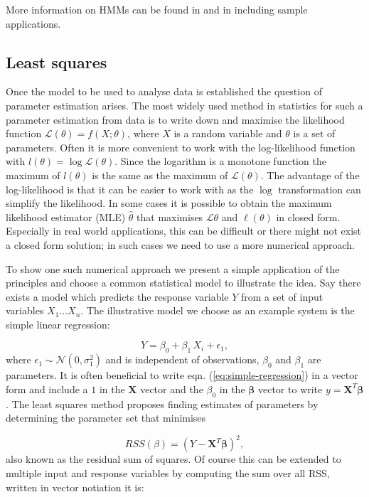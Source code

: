 More information on HMMs can be found in \cite{MacDonald:1997wm} and in \cite{Zucchini:2009vl} including sample applications.


\subsection{Least squares}
\label{sec:least-squares}

Once the model to be used to analyse data is established the question of parameter estimation arises. The most widely used method in statistics for such a parameter estimation from data is  to write down and maximise the likelihood function $ \mathcal{L}(\theta) = f(X; \theta) $, where $X$ is a random variable and $\theta$ is a set of parameters. Often it is more convenient to work with the log-likelihood function with $l(\theta) = \log \mathcal{L}(\theta)$. Since the logarithm is a monotone function the maximum of $l (\theta)$ is the same as the maximum of $\mathcal{L} (\theta)$. The advantage of the log-likelihood is that it can be easier to work with as the $\log$ transformation can simplify the likelihood. In some cases it is possible to obtain the maximum likelihood estimator (MLE) $\hat{\theta}$ that maximises $\mathcal{L}{\theta}$ and $\ell (\theta)$ in closed form. Especially in real world applications, this can be difficult or there might not exist a closed form solution; in such cases we need to use a more numerical approach. 

To show one such numerical approach we present a simple application of the principles and choose a common statistical model to illustrate the idea. Say there exists a model which predicts the response variable $Y$ from a set of input variables $X_1 \ldots X_n$. The illustrative model we choose as an example system is the simple linear regression:

\begin{equation}
  \label{eq:simple-regression}
  Y = \beta_0 + \beta_1 \, X_i + \epsilon_1,
\end{equation}
where $\epsilon_1 \sim \mathcal{N}(0, \sigma_1^2)$ and is independent of observations, $\beta_0$ and $\beta_1$ are parameters. It is often beneficial to write eqn. (\ref{eq:simple-regression}) in a vector form and include a $1$ in the $\mathbf{X}$ vector and the $\beta_0$ in the $\mathbf{\beta}$ vector to write $y = \mathbf{X}^T \mathbf{\beta}$. The least squares method proposes finding estimates of parameters by determining the parameter set that minimises

\begin{equation}
  \label{eq:rss-ls}
  RSS(\beta) = (Y - \mathbf{X}^T \mathbf{\beta})^2, 
\end{equation}
also known as the residual sum of squares. Of course this can be extended to multiple input and response variables by computing the sum over all RSS, written in vector notiation it is:

